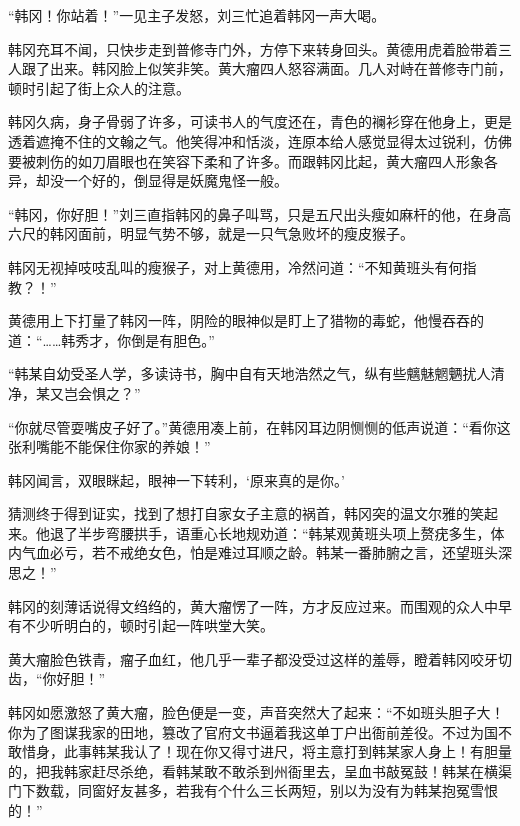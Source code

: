 “韩冈！你站着！”一见主子发怒，刘三忙追着韩冈一声大喝。

韩冈充耳不闻，只快步走到普修寺门外，方停下来转身回头。黄德用虎着脸带着三人跟了出来。韩冈脸上似笑非笑。黄大瘤四人怒容满面。几人对峙在普修寺门前，顿时引起了街上众人的注意。

韩冈久病，身子骨弱了许多，可读书人的气度还在，青色的襕衫穿在他身上，更是透着遮掩不住的文翰之气。他笑得冲和恬淡，连原本给人感觉显得太过锐利，仿佛要被刺伤的如刀眉眼也在笑容下柔和了许多。而跟韩冈比起，黄大瘤四人形象各异，却没一个好的，倒显得是妖魔鬼怪一般。

“韩冈，你好胆！”刘三直指韩冈的鼻子叫骂，只是五尺出头瘦如麻杆的他，在身高六尺的韩冈面前，明显气势不够，就是一只气急败坏的瘦皮猴子。

韩冈无视掉吱吱乱叫的瘦猴子，对上黄德用，冷然问道：“不知黄班头有何指教？！”

黄德用上下打量了韩冈一阵，阴险的眼神似是盯上了猎物的毒蛇，他慢吞吞的道：“……韩秀才，你倒是有胆色。”

“韩某自幼受圣人学，多读诗书，胸中自有天地浩然之气，纵有些魑魅魍魉扰人清净，某又岂会惧之？”

“你就尽管耍嘴皮子好了。”黄德用凑上前，在韩冈耳边阴恻恻的低声说道：“看你这张利嘴能不能保住你家的养娘！”

韩冈闻言，双眼眯起，眼神一下转利，‘原来真的是你。’

猜测终于得到证实，找到了想打自家女子主意的祸首，韩冈突的温文尔雅的笑起来。他退了半步弯腰拱手，语重心长地规劝道：“韩某观黄班头项上赘疣多生，体内气血必亏，若不戒绝女色，怕是难过耳顺之龄。韩某一番肺腑之言，还望班头深思之！”

韩冈的刻薄话说得文绉绉的，黄大瘤愣了一阵，方才反应过来。而围观的众人中早有不少听明白的，顿时引起一阵哄堂大笑。

黄大瘤脸色铁青，瘤子血红，他几乎一辈子都没受过这样的羞辱，瞪着韩冈咬牙切齿，“你好胆！”

韩冈如愿激怒了黄大瘤，脸色便是一变，声音突然大了起来：“不如班头胆子大！你为了图谋我家的田地，篡改了官府文书逼着我这单丁户出衙前差役。不过为国不敢惜身，此事韩某我认了！现在你又得寸进尺，将主意打到韩某家人身上！有胆量的，把我韩家赶尽杀绝，看韩某敢不敢杀到州衙里去，呈血书敲冤鼓！韩某在横渠门下数载，同窗好友甚多，若我有个什么三长两短，别以为没有为韩某抱冤雪恨的！”

